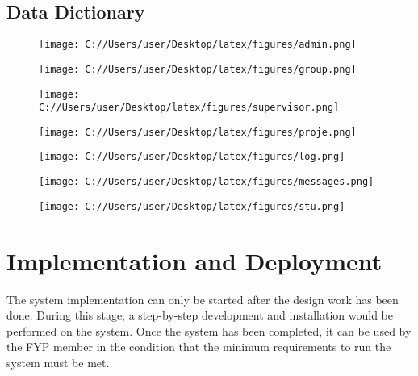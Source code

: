 \documentclass{article}
\begin{document}
\subsection{Data Dictionary}
 \begin{figure}[h!]
  \texttt{[image: C://Users/user/Desktop/latex/figures/admin.png]}
\end{figure}
 \begin{figure}[h!]
  \texttt{[image: C://Users/user/Desktop/latex/figures/group.png]}
\end{figure}
 \begin{figure}[h!]
  \texttt{[image: C://Users/user/Desktop/latex/figures/supervisor.png]}
\end{figure}
 \begin{figure}[h!]
  \texttt{[image: C://Users/user/Desktop/latex/figures/proje.png]}
\end{figure}
 \begin{figure}[h!]
  \texttt{[image: C://Users/user/Desktop/latex/figures/log.png]}
\end{figure}
 \begin{figure}[h!]
  \texttt{[image: C://Users/user/Desktop/latex/figures/messages.png]}
\end{figure}
 \begin{figure}[h!]
  \texttt{[image: C://Users/user/Desktop/latex/figures/stu.png]}
\end{figure}
\newpage
\vspace*{8mm}
\section{Implementation and Deployment}
\par The system implementation can only be started after the design work has been done. During this stage, a step-by-step development and installation would be performed on the system. Once the system has been completed, it can be used by the FYP member in the condition that the minimum requirements to run the system must be met.
\end{document}
